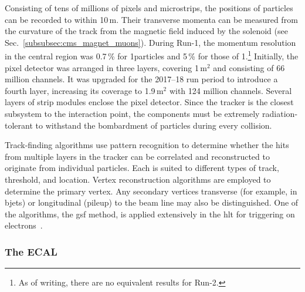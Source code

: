 Consisting of tens of millions of pixels and microstrips, the positions of particles can be recorded to within 10\,\si{\micro}m. Their transverse momenta can be measured from the curvature of the track from the magnetic field induced by the solenoid (see Sec.~\ref{subsubsec:cms_magnet_muons}). During Run-1, the momentum resolution in the central region was 0.7\,\% for 1\GeVc particles and 5\,\% for those of 1\TeVc.\footnote{As of writing, there are no equivalent results for Run-2.} Initially, the pixel detector was arranged in three layers, covering 1\,m$^2$ and consisting of 66 million channels. It was upgraded for the 2017--18 run period to introduce a fourth layer, increasing its coverage to 1.9\,m$^2$ with 124 million channels. Several layers of strip modules enclose the pixel detector. Since the tracker is the closest subsystem to the interaction point, the components must be extremely radiation-tolerant to withstand the bombardment of particles during every collision.


Track-finding algorithms use pattern recognition to determine whether the hits from multiple layers in the tracker can be correlated and reconstructed to originate from individual particles. Each is suited to different types of track, \pt threshold, and location. Vertex reconstruction algorithms are employed to determine the primary vertex. Any secondary vertices transverse (for example, in \glspl{bjet}) or longitudinal (\gls{pileup}) to the beam line may also be distinguished. One of the algorithms, the \acrfull{gsf} method, is applied extensively in the \acrshort{hlt} for triggering on electrons~\cite{Anuar_2015}.





\subsubsection{The ECAL}
\label{subsubsec:cms_ecal}

